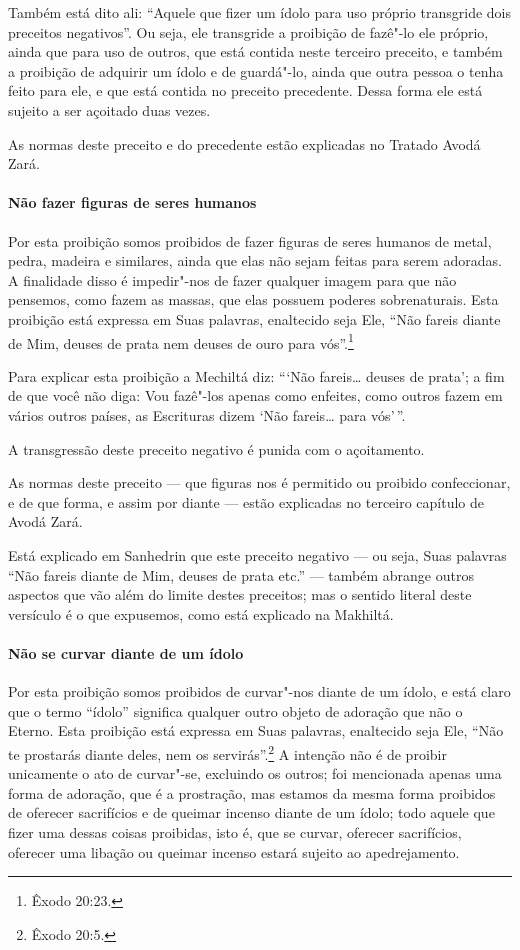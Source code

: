 \begin{multicols}{2}
Também está dito ali: ``Aquele que fizer um ídolo para uso próprio
transgride dois preceitos negativos''. Ou seja, ele transgride a
proibição de fazê"-lo ele próprio, ainda que para uso de outros, que está
contida neste terceiro preceito, e também a proibição de adquirir um
ídolo e de guardá"-lo, ainda que outra pessoa o tenha feito para ele, e
que está contida no preceito precedente. Dessa forma ele está sujeito a
ser açoitado duas vezes.

As normas deste preceito e do precedente estão explicadas no Tratado
Avodá Zará\starr.

\paragraph{Não fazer figuras de seres humanos}

Por esta proibição somos proibidos de fazer figuras de seres humanos de
metal, pedra, madeira e similares, ainda que elas não sejam feitas para
serem adoradas. A finalidade disso é impedir"-nos de fazer qualquer
imagem para que não pensemos, como fazem as massas, que elas possuem
poderes sobrenaturais. Esta proibição está expressa em Suas palavras,
enaltecido seja Ele, ``Não fareis diante de Mim, deuses de prata nem
deuses de ouro para vós''.\footnote{Êxodo 20:23.}

Para explicar esta proibição a Mechiltá\starr{} diz: ```Não fareis\ldots{} deuses de
prata'; a fim de que você não diga: Vou fazê"-los apenas como enfeites,
como outros fazem em vários outros países, as Escrituras dizem `Não
fareis\ldots{} para vós'\,''.

A transgressão deste preceito negativo é punida com o açoitamento.

As normas deste preceito --- que figuras nos é permitido ou proibido
confeccionar, e de que forma, e assim por diante --- estão explicadas no
terceiro capítulo de Avodá Zará\starr.

Está explicado em Sanhedrin\starr{} que este preceito negativo --- ou seja, Suas
palavras ``Não fareis diante de Mim, deuses de prata etc.'' --- também
abrange outros aspectos que vão além do limite destes preceitos; mas o
sentido literal deste versículo é o que expusemos, como está explicado
na Makhiltá.

\paragraph{Não se curvar diante de um ídolo}

Por esta proibição somos proibidos de curvar"-nos diante de um ídolo, e
está claro que o termo ``ídolo'' significa qualquer outro objeto de
adoração que não o Eterno. Esta proibição está expressa em Suas
palavras, enaltecido seja Ele, ``Não te prostarás diante deles, nem os
servirás''.\footnote{Êxodo 20:5.} A intenção não é de proibir unicamente o ato de
curvar"-se, excluindo os outros; foi mencionada apenas uma forma de
adoração, que é a prostração, mas estamos da mesma forma proibidos de
oferecer sacrifícios e de queimar incenso diante de um ídolo; todo
aquele que fizer uma dessas coisas proibidas, isto é, que se curvar,
oferecer sacrifícios, oferecer uma libação ou queimar incenso estará
sujeito ao apedrejamento.


\end{multicols}
